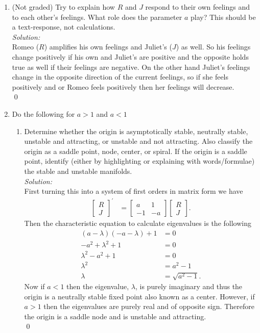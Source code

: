 \documentclass[10pt]{amsart}
\theoremstyle{nonumberplain}
\begin{document}
\begin{enumerate}[label={\bf {\arabic*}:}]
\begin{enumerate}

\item (Not graded) Try to explain how $R$ and $J$ respond to their own feelings and to each other’s feelings.
What role does the parameter $a$ play?
This should be a text-response, not calculations. \\
\textit{Solution:} \\
Romeo ($R$) amplifies his own feelings and Juliet's ($J$) as well.
So his feelings change positively if his own and Juliet's are positive and the opposite holds true as well if their feelings are negative.
On the other hand Juliet's feelings change in the opposite direction of the current feelings, so if she feels positively and or Romeo feels positively then her feelings will decrease.
\\
\qed

\item Do the following for $a > 1$ and $ a < 1$ \\

\begin{enumerate}

\item Determine whether the origin is asymptotically stable, neutrally stable, unstable and attracting, or unstable and not attracting.
Also classify the origin as a saddle point, node, center, or spiral.
If the origin is a saddle point, identify (either by highlighting or explaining with words/formulae) the stable and unstable manifolds. \\
\textit{Solution:} \\
First turning this into a system of first orders in matrix form we have
\begin{align*}
\begin{bmatrix}
R \\ J
\end{bmatrix}^\prime
&= \begin{bmatrix}
a & 1 \\
-1 & -a
\end{bmatrix} \begin{bmatrix}
R \\ J
\end{bmatrix}.
\end{align*}
Then the characteristic equation to calculate eigenvalues is the following
\begin{align*}
(a - \lambda)(-a - \lambda) + 1 &= 0 \\
-a^2 + \lambda^2 + 1 &= 0 \\
\lambda^2 - a^2 + 1 &= 0 \\
\lambda^2 &= a^2 - 1 \\
\lambda &= \sqrt{a^2 - 1}.
\end{align*}
Now if $a < 1$ then the eigenvalue, $\lambda$, is purely imaginary and thus the origin is a neutrally stable fixed point also known as a center.
However, if $a > 1$ then the eigenvalues are purely real and of opposite sign.
Therefore the origin is a saddle node and is unstable and attracting. \\
\qed \\


\end{enumerate}
\end{enumerate}
\end{enumerate}
\end{document}
